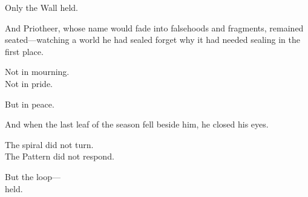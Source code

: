 \documentclass[9pt]{article}
\begin{document}
\vspace{0.5em}
Only the Wall held.

\vspace{0.5em}
And Priotheer, whose name would fade into falsehoods and fragments, remained seated---watching a world he had sealed forget why it had needed sealing in the first place.

\vspace{0.5em}
Not in mourning.\\
Not in pride.

\vspace{0.5em}
But in peace.

\vspace{0.5em}
And when the last leaf of the season fell beside him, he closed his eyes.

\vspace{0.5em}
The spiral did not turn.\\
The Pattern did not respond.

\vspace{0.5em}
But the loop---\\
held.
\end{document}
